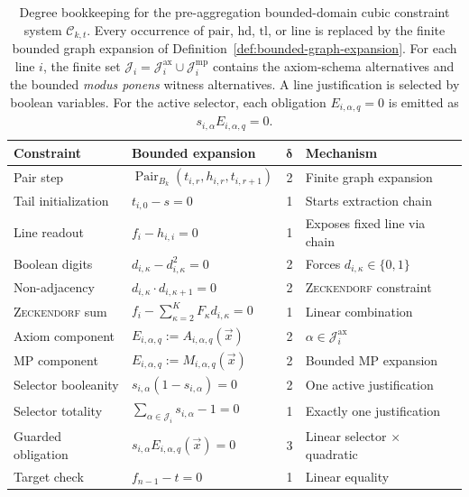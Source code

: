 \documentclass[letterpaper,10pt]{article}
\theoremstyle{upright}
\theoremstyle{upright}
\begin{document}
\begin{table}[ht]
	\centering
	\scriptsize
	\renewcommand{\arraystretch}{1.4}
	\begin{tabular}{@{}p{3.0cm}p{3.0cm}cp{3.4cm}@{}}
		\toprule
		\textsf{Constraint} & \textsf{Bounded expansion} & $\boldsymbol{\delta}$ & \textsf{Mechanism} \\
		\midrule
		Pair step
			& $\operatorname{Pair}_{B_k}(t_{i,r},h_{i,r},t_{i,r+1})$
			& 2 & Finite graph expansion \\
		Tail initialization
			& $t_{i,0} - s = 0$
			& 1 & Starts extraction chain \\
		Line readout
			& $f_i - h_{i,i} = 0$
			& 1 & Exposes fixed line via chain \\
		Boolean digits
			& $d_{i,\kappa} - d_{i,\kappa}^2 = 0$
			& 2 & Forces $d_{i,\kappa} \in \{0,1\}$ \\
		Non-adjacency
			& $d_{i,\kappa}\cdot d_{i,\kappa+1} = 0$
			& 2 & \textsc{Zeckendorf} constraint \\
		\textsc{Zeckendorf} sum
			& $f_i - \sum_{\kappa=2}^K F_\kappa d_{i,\kappa} = 0$
			& 1 & Linear combination \\
		Axiom component
			& $E_{i,\alpha,q}:=A_{i,\alpha,q}(\vec{x})$
			& 2 & $\alpha\in\mathcal{J}^{\mathrm{ax}}_i$ \\
		MP component
			& $E_{i,\alpha,q}:=M_{i,\alpha,q}(\vec{x})$
			& 2 & Bounded MP expansion \\
		Selector booleanity
			& $s_{i,\alpha}(1-s_{i,\alpha})=0$
			& 2 & One active justification \\
		Selector totality
			& $\sum_{\alpha\in\mathcal{J}_i}s_{i,\alpha}-1=0$
			& 1 & Exactly one justification \\
		Guarded obligation
			& $s_{i,\alpha}E_{i,\alpha,q}(\vec{x})=0$
			& 3 & Linear selector $\times$ quadratic \\
		Target check
			& $f_{n-1} - t = 0$
			& 1 & Linear equality \\
		\bottomrule
	\end{tabular}
	\caption{\label{tab:constraints}Degree bookkeeping for the pre-aggregation bounded-domain cubic constraint system $\mathcal{C}_{k,t}$. Every occurrence of $\mathrm{pair}$, $\mathrm{hd}$, $\mathrm{tl}$, or $\mathrm{line}$ is replaced by the finite bounded graph expansion of Definition~\ref{def:bounded-graph-expansion}. For each line $i$, the finite set $\mathcal{J}_i=\mathcal{J}^{\mathrm{ax}}_i\cup\mathcal{J}^{\mathrm{mp}}_i$ contains the axiom-schema alternatives and the bounded \emph{modus ponens} witness alternatives. A line justification is selected by boolean variables. For the active selector, each obligation $E_{i,\alpha,q}=0$ is emitted as $s_{i,\alpha}E_{i,\alpha,q}=0$.}
\end{table}
\end{document}
